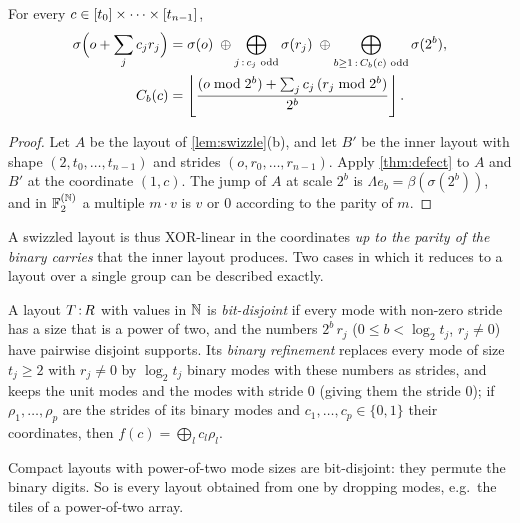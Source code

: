 \begin{theorem}\label{thm:swzcomp}
For every $c\in[t_0]\times\dots\times[t_{n-1}]$,
\begin{align*}
 \sigma\Bigl(o+\sum_jc_jr_j\Bigr)&=\sigma(o)\;\oplus\bigoplus_{j\,:\,c_j\text{ odd}}\sigma(r_j)
 \;\oplus\bigoplus_{b\ge1\,:\,C_b(c)\text{ odd}}\sigma(2^b),\\
 C_b(c)&=\left\lfloor \frac{(o\bmod2^b)+\sum_jc_j\,(r_j\bmod2^b)}{2^b} \right\rfloor .
\end{align*}
\end{theorem}
\begin{proof}
Let $A$ be the layout of \cref{lem:swizzle}(b), and let $B'$ be the inner layout with shape
$(2,t_0,\dots,t_{n-1})$ and strides $(o,r_0,\dots,r_{n-1})$. Apply \cref{thm:defect} to $A$ and
$B'$ at the coordinate $(1,c)$. The jump of $A$ at scale $2^b$ is
$\Lambda e_b=\beta(\sigma(2^b))$, and in $\mathbb{F}_2^{(\mathbb{N})}$ a multiple $m\cdot v$ is $v$ or $0$
according to the parity of $m$.
\end{proof}

A swizzled layout is thus XOR-linear in the coordinates \emph{up to the parity of the binary
carries} that the inner layout produces. Two cases in which it reduces to a layout over a single
group can be described exactly.

\begin{definition}\label{def:bitdisjoint}
A layout $T\,{:}\,R$ with values in $\mathbb{N}$ is \emph{bit-disjoint} if every mode with non-zero stride
has a size that is a power of two, and the numbers $2^b\,r_j$ ($0\le b<\log_2t_j$, $r_j\ne0$)
have pairwise disjoint supports. Its \emph{binary refinement} replaces every mode of size
$t_j\ge2$ with $r_j\neq0$ by $\log_2t_j$ binary modes with these numbers as strides, and keeps the
unit modes and the modes with stride $0$ (giving them the stride $0$); if
$\rho_1,\dots,\rho_p$ are the strides of its binary modes and $c_1,\dots,c_p\in\{0,1\}$ their
coordinates, then $f(c)=\bigoplus_lc_l\rho_l$.
\end{definition}
\noindent Compact layouts with power-of-two mode sizes are bit-disjoint: they permute the binary
digits. So is every layout obtained from one by dropping modes, e.g.\ the tiles of a power-of-two
array.

